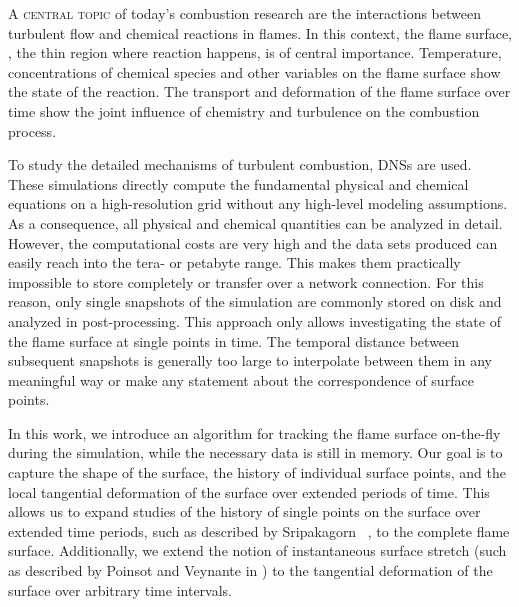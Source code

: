 %
\lettrine[lines=3, findent=-12pt, nindent=7pt, slope=7pt]{A}{ central topic} of today's combustion research are the interactions between
turbulent flow and chemical reactions in flames.
%
In this context, the flame surface, \ie, the thin region where reaction happens,
is of central importance.
%
Temperature, concentrations of chemical species and other variables on the flame
surface show the state of the reaction.
%
The transport and deformation of the flame surface over time show the joint
influence of chemistry and turbulence on the combustion process.
%

%
To study the detailed mechanisms of turbulent combustion, \acp{DNS} are used.
%
These simulations directly compute the fundamental physical and chemical
equations on a high-resolution grid without any high-level modeling assumptions.
%
As a consequence, all physical and chemical quantities can be analyzed in detail.
%
However, the computational costs are very high and the data sets produced can
easily reach into the tera- or petabyte range.
%
This makes them practically impossible to store completely or transfer over a
network connection.
%
For this reason, only single snapshots of the simulation are commonly stored
on disk and analyzed in post-processing.
%
This approach only allows investigating the state of the flame surface at single
points in time.
%
The temporal distance between subsequent snapshots is generally too large to
interpolate between them in any meaningful way or make any statement about
the correspondence of surface points.
%

%
In this work, we introduce an algorithm for tracking the flame surface
on-the-fly during the simulation, while the necessary data is still in memory.
%
Our goal is to capture the shape of the surface, the history of individual
surface points, and the local tangential deformation of the surface over
extended periods of time.
%
This allows us to expand studies of the history of single points on the surface
over extended time periods, such as described by Sripakagorn
\etal~\cite{Sripakagorn2004}, to the complete flame surface.
%
Additionally, we extend the notion of instantaneous surface stretch (such as
described by Poinsot and Veynante in \cite{Poinsot2012}) to the tangential
deformation of the surface over arbitrary time intervals.
%


